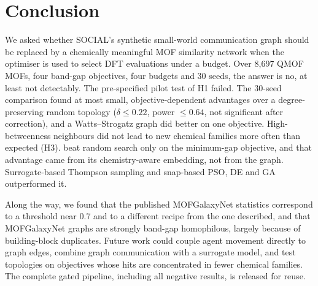 \section{Conclusion}
\label{sec:conclusion}

We asked whether SOCIAL's synthetic small-world communication graph should be replaced by a chemically meaningful MOF similarity network when the optimiser is used to select DFT evaluations under a budget. Over 8{,}697 QMOF MOFs, four band-gap objectives, four budgets and 30 seeds, the answer is no, at least not detectably. The pre-specified pilot test of H1 failed. The 30-seed comparison found at most small, objective-dependent advantages over a degree-preserving random topology ($\delta\leq0.22$, power $\leq0.64$, not significant after correction), and a Watts--Strogatz graph did better on one objective. High-betweenness neighbours did not lead to new chemical families more often than expected (H3). \gs{} beat random search only on the minimum-gap objective, and that advantage came from its chemistry-aware embedding, not from the graph. Surrogate-based Thompson sampling and snap-based PSO, DE and GA outperformed it.

Along the way, we found that the published MOFGalaxyNet statistics correspond to a threshold near 0.7 and to a different recipe from the one described, and that MOFGalaxyNet graphs are strongly band-gap homophilous, largely because of building-block duplicates. Future work could couple agent movement directly to graph edges, combine graph communication with a surrogate model, and test topologies on objectives whose hits are concentrated in fewer chemical families. The complete gated pipeline, including all negative results, is released for reuse.
